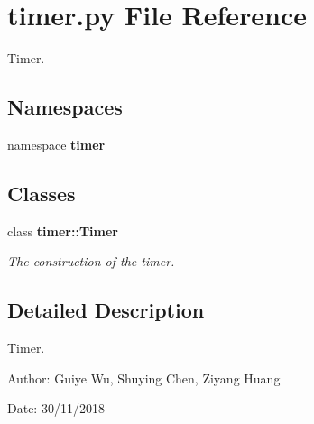 \section{timer.py File Reference}
\label{timer_8py}
Timer. 

\subsection*{Namespaces}
\begin{CompactItemize}
\item 
namespace \textbf{timer}
\end{CompactItemize}
\subsection*{Classes}
\begin{CompactItemize}
\item 
class \bf{timer::Timer}
\begin{CompactList}\small\item\em The construction of the timer. \item\end{CompactList}\end{CompactItemize}


\subsection{Detailed Description}
Timer. 

\begin{Desc}
\item[Author:]Guiye Wu, Shuying Chen, Ziyang Huang \end{Desc}
\begin{Desc}
\item[Date:]30/11/2018 \end{Desc}
